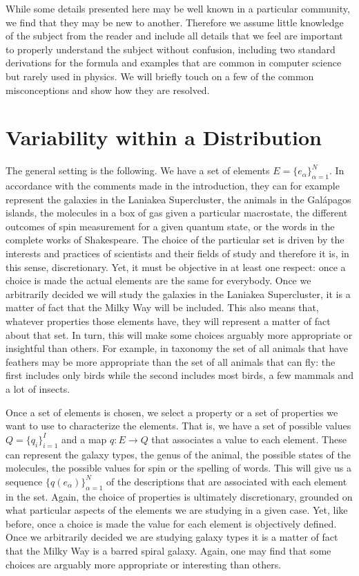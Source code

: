\documentclass[iopart]{revtex4-1}
\begin{document}
While some details presented here may be well known in a particular community, we find that they may be new to another. Therefore we assume little knowledge of the subject from the reader and include all details that we feel are important to properly understand the subject without confusion, including two standard derivations for the formula and examples that are common in computer science but rarely used in physics. We will briefly touch on a few of the common misconceptions and show how they are resolved.

\section{Variability within a Distribution\label{vwd}}

The general setting is the following. We have a set of elements $E = \{e_\alpha\}_{\alpha=1}^N$. In accordance with the comments made in the introduction, they can for example represent the galaxies in the Laniakea Supercluster, the animals in the Gal\'{a}pagos islands, the molecules in a box of gas given a particular macrostate, the different outcomes of spin measurement for a given quantum state, or the words in the complete works of Shakespeare. The choice of the particular set is driven by the interests and practices of scientists and their fields of study and therefore it is, in this sense, discretionary. Yet, it must be objective in at least one respect: once a choice is made the actual elements are the same for everybody. Once we arbitrarily decided we will study the galaxies in the Laniakea Supercluster, it is a matter of fact that the Milky Way will be included. This also means that, whatever properties those elements have, they will represent a matter of fact about that set. In turn, this will make some choices arguably more appropriate or insightful than others. For example, in taxonomy the set of all animals that have feathers may be more appropriate than the set of all animals that can fly: the first includes only birds while the second includes most birds, a few mammals and a lot of insects.

Once a set of elements is chosen, we select a property or a set of properties we want to use to characterize the elements. That is, we have a set of possible values $Q=\{q_i\}_{i=1}^I$ and a map $q : E \to Q$ that associates a value to each element. These can represent the galaxy types, the genus of the animal, the possible states of the molecules, the possible values for spin or the spelling of words. This will give us a sequence $\{q(e_\alpha)\}_{\alpha=1}^N$ of the descriptions that are associated with each element in the set. Again, the choice of properties is ultimately discretionary, grounded on what particular aspects of the elements we are studying in a given case. Yet, like before, once a choice is made the value for each element is objectively defined. Once we arbitrarily decided we are studying galaxy types it is a matter of fact that the Milky Way is a barred spiral galaxy. Again, one may find that some choices are arguably more appropriate or interesting than others.
\end{document}

